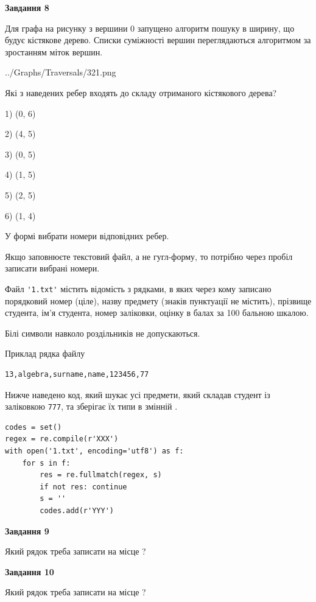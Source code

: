 \documentclass[12pt, ukrainian]{article}
\def\code#1{\Verb!#1!}
\begin{document}
{\begin {large}
{\begin {center}\textbf{Завдання 8}\end {center}}\par
Для графа на рисунку з вершини 0 запущено алгоритм пошуку в ширину, що будує кістякове дерево. Списки суміжності вершин переглядаються алгоритмом за зростанням міток вершин.\par
\begin{center}
	{../Graphs/Traversals/321.png}
\end{center}
\par Які з наведених ребер входять до складу отриманого кістякового дерева?\par
1) (0, 6)\par
2) (4, 5)\par
3) (0, 5)\par
4) (1, 5)\par
5) (2, 5)\par
6) (1, 4)\par
{\vskip 15pt} У формі вибрати номери відповідних ребер.


Якщо заповнюєте текстовий файл, а не гугл-форму, то потрібно через пробіл записа\-ти вибрані номери.\par
\newpage


Файл \code{'1.txt'} містить відомість з рядками, в яких через кому записано поряд\-ковий номер (ціле), назву предмету (знаків пунктуації не містить), прізвище студента, ім'я студента, номер заліковки, оцінку в балах за 100 бальною шкалою.

Білі символи навколо роздільників не допускаються.

Приклад рядка файлу



\begin{verbatim}
13,algebra,surname,name,123456,77
\end{verbatim}


Нижче наведено код, який шукає усі предмети, який складав студент із заліковкою \code{777}, та зберігає їх типи в змінній .



\begin{verbatim}
codes = set()
regex = re.compile(r'XXX')
with open('1.txt', encoding='utf8') as f:
    for s in f:
        res = re.fullmatch(regex, s)
        if not res: continue
        s = ''
        codes.add(r'YYY')
\end{verbatim}


{\begin {center}\textbf{Завдання 9}\end {center}}\par
Який рядок треба записати на місце  ?\par
\vspace{5mm}


{\begin {center}\textbf{Завдання 10}\end {center}}\par
Який рядок треба записати на місце  ?\par


\newpage


\end {large}}
\end{document}
